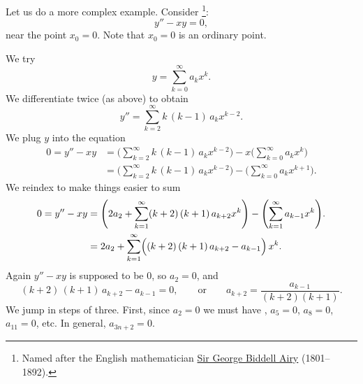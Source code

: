 \begin{example}
Let us do a more complex example.  Consider
\emph{}%
\footnote{Named after the English mathematician
\href{http://en.wikipedia.org/wiki/George_Biddell_Airy}{Sir George Biddell Airy}
(1801--1892).}:
\begin{equation*}
y'' - xy = 0 ,
\end{equation*}
near the point $x_0 = 0$.  Note that $x_0 = 0$ is an ordinary point.

\pagebreak[2]
We try
\begin{equation*}
y = \sum_{k=0}^\infty a_k x^k .
\end{equation*}
We differentiate twice (as above) to obtain
\begin{equation*}
y'' = \sum_{k=2}^\infty k\,(k-1) \, a_k x^{k-2} .
\end{equation*}
We plug $y$ into the equation
\begin{equation*}
\begin{split}
0 = y''-xy &= 
\Biggl( \sum_{k=2}^\infty k\,(k-1) \, a_k x^{k-2}  \Biggr)
-
x
\Biggl( \sum_{k=0}^\infty a_k x^k \Biggr)
\\
&=
\Biggl( \sum_{k=2}^\infty k\,(k-1) \, a_k x^{k-2}  \Biggr)
-
\Biggl( \sum_{k=0}^\infty a_k x^{k+1} \Biggr) .
\end{split}
\end{equation*}
We reindex to make things easier to sum
\begin{equation*}
\begin{split}
0 = y''-xy
&= 
\Biggl( 2 a_2 + \sum_{k=1}^\infty (k+2)\,(k+1) \, a_{k+2} x^k  \Biggr)
-
\Biggl( \sum_{k=1}^\infty a_{k-1} x^k \Biggr) .
\\
&= 
2 a_2 + 
\sum_{k=1}^\infty \Bigl( (k+2)\,(k+1) \, a_{k+2} - a_{k-1} \Bigr) \, x^k .
\end{split}
\end{equation*}
Again $y''-xy$ is supposed to be 0, so $a_2 = 0$, and
\begin{equation*}
(k+2)\,(k+1) \,a_{k+2} - a_{k-1} = 0 ,
\qquad
\text{or}
\qquad
a_{k+2} = \frac{a_{k-1}}{(k+2)(k+1)} .
\end{equation*}
We jump in steps of three.  First, since $a_2 = 0$
we must have , $a_5 = 0$, $a_8 = 0$, $a_{11}=0$, etc.
In general, $a_{3n+2} = 0$.


\end{example}
